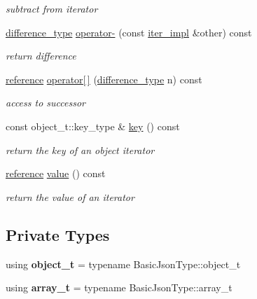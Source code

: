 \begin{DoxyCompactItemize}
\begin{DoxyCompactList}\small\item\em subtract from iterator \end{DoxyCompactList}\item 
\mbox{\hyperlink{classnlohmann_1_1detail_1_1iter__impl_a2f7ea9f7022850809c60fc3263775840}{difference\+\_\+type}} \mbox{\hyperlink{classnlohmann_1_1detail_1_1iter__impl_a49bf3e708a9c1c88c415011735962d06}{operator-\/}} (const \mbox{\hyperlink{classnlohmann_1_1detail_1_1iter__impl}{iter\+\_\+impl}} \&other) const
\begin{DoxyCompactList}\small\item\em return difference \end{DoxyCompactList}\item 
\mbox{\hyperlink{classnlohmann_1_1detail_1_1iter__impl_a5be8001be099c6b82310f4d387b953ce}{reference}} \mbox{\hyperlink{classnlohmann_1_1detail_1_1iter__impl_ac0b9276f1102ed4b9cd3f5f56287e3ce}{operator\mbox{[}$\,$\mbox{]}}} (\mbox{\hyperlink{classnlohmann_1_1detail_1_1iter__impl_a2f7ea9f7022850809c60fc3263775840}{difference\+\_\+type}} n) const
\begin{DoxyCompactList}\small\item\em access to successor \end{DoxyCompactList}\item 
const object\+\_\+t\+::key\+\_\+type \& \mbox{\hyperlink{classnlohmann_1_1detail_1_1iter__impl_a15dfb2744fed2ef40c12a9e9a20d6dbc}{key}} () const
\begin{DoxyCompactList}\small\item\em return the key of an object iterator \end{DoxyCompactList}\item 
\mbox{\hyperlink{classnlohmann_1_1detail_1_1iter__impl_a5be8001be099c6b82310f4d387b953ce}{reference}} \mbox{\hyperlink{classnlohmann_1_1detail_1_1iter__impl_ab447c50354c6611fa2ae0100ac17845c}{value}} () const
\begin{DoxyCompactList}\small\item\em return the value of an iterator \end{DoxyCompactList}\end{DoxyCompactItemize}
\subsection*{Private Types}
\begin{DoxyCompactItemize}
\item 
\mbox{\label{classnlohmann_1_1detail_1_1iter__impl_ab9a9598052e83fa14a2288e56d5dda7c}} 
using {\bfseries object\+\_\+t} = typename Basic\+Json\+Type\+::object\+\_\+t
\item 
\mbox{\label{classnlohmann_1_1detail_1_1iter__impl_aef02cf75b1cb199286fd2f666c60e38e}} 
using {\bfseries array\+\_\+t} = typename Basic\+Json\+Type\+::array\+\_\+t
\end{DoxyCompactItemize}
